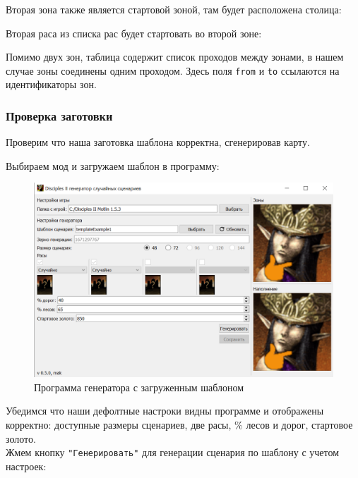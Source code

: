Вторая зона также является стартовой зоной, там будет расположена столица:

\begin{figure}[H]

\end{figure}

Вторая раса из списка рас будет стартовать во второй зоне:

\begin{figure}[H]

\end{figure}

Помимо двух зон, таблица содержит список проходов между зонами, в нашем случае зоны соединены одним проходом. Здесь поля \texttt{from} и \texttt{to} ссылаются на идентификаторы зон.

\begin{figure}[H]

\end{figure}

\subsubsection{Проверка заготовки}
Проверим что наша заготовка шаблона корректна, сгенерировав карту.

Выбираем мод и загружаем шаблон в программу:

\begin{figure}[H]
\center
\includegraphics[width=.8\linewidth]{docImages/exampleTemplateLoaded.png}
\caption{Программа генератора с загруженным шаблоном}
\end{figure}

Убедимся что наши дефолтные настроки видны программе и отображены корректно: доступные размеры сценариев, две расы, \% лесов и дорог, стартовое золото.\\
Жмем кнопку \texttt{"Генерировать"} для генерации сценария по шаблону с учетом настроек:

